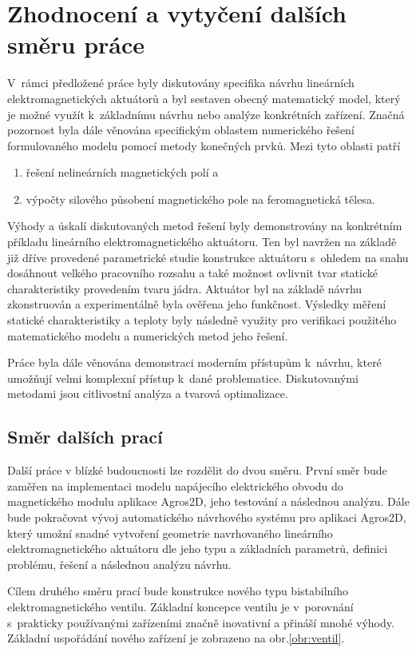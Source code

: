 \chapter{Zhodnocení a vytyčení dalších směru práce}
V~rámci předložené práce byly diskutovány specifika návrhu lineárních elektromagnetických aktuátorů a byl sestaven obecný matematický model, který je možné využít k~základnímu návrhu nebo analýze konkrétních zařízení. Značná pozornost byla dále věnována specifickým oblastem numerického řešení formulovaného modelu pomocí metody konečných prvků. Mezi tyto oblasti patří
\begin{enumerate}[a]
    \item řešení nelineárních magnetických polí a
    \item výpočty silového působení magnetického pole na feromagnetická tělesa.
\end{enumerate}

Výhody a úskalí diskutovaných metod řešení byly demonstrovány na konkrétním příkladu lineárního elektromagnetického aktuátoru. Ten byl navržen na základě již dříve provedené parametrické studie konstrukce aktuátoru s~ohledem na snahu dosáhnout velkého pracovního rozsahu a také možnost ovlivnit tvar statické charakteristiky provedením tvaru jádra. Aktuátor byl na základě návrhu zkonstruován a experimentálně byla ověřena jeho funkčnost. Výsledky měření statické charakteristiky a teploty byly následně využity pro verifikaci použitého matematického modelu a numerických metod jeho řešení.

Práce byla dále věnována demonstraci moderním přístupům k~návrhu, které umožňují velmi komplexní přístup k~dané problematice. Diskutovanými metodami jsou citlivostní analýza a tvarová optimalizace.

\section{Směr dalších prací}
Další práce v blízké budoucnosti lze rozdělit do dvou směru. První směr bude zaměřen na implementaci modelu napájecího elektrického obvodu do magnetického modulu aplikace Agros2D, jeho testování a následnou analýzu. Dále bude pokračovat vývoj automatického návrhového systému pro aplikaci Agros2D, který umožní snadné vytvoření geometrie navrhovaného lineárního elektromagnetického aktuátoru dle jeho typu a základních parametrů, definici problému, řešení a následnou analýzu návrhu.

Cílem druhého směru prací bude konstrukce nového typu bistabilního elektromagnetického ventilu. Základní koncepce ventilu je v~porovnání s~prakticky používanými zařízeními značně inovativní a přináší mnohé výhody. Základní uspořádání nového zařízení je zobrazeno na obr.\ref{obr:ventil}.

